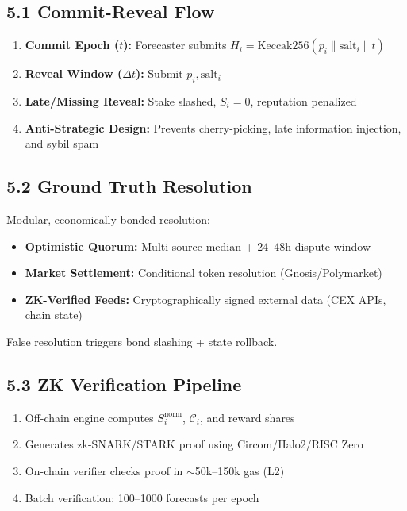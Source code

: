 \documentclass[11pt,a4paper]{article}
\begin{document}
\subsection*{5.1 Commit-Reveal Flow}
\begin{enumerate}[leftmargin=*]
    \item \textbf{Commit Epoch ($t$):} Forecaster submits $H_i = \text{Keccak256}(p_i \parallel \text{salt}_i \parallel t)$
    \item \textbf{Reveal Window ($\Delta t$):} Submit $p_i, \text{salt}_i$
    \item \textbf{Late/Missing Reveal:} Stake slashed, $S_i = 0$, reputation penalized
    \item \textbf{Anti-Strategic Design:} Prevents cherry-picking, late information injection, and sybil spam
\end{enumerate}

\subsection*{5.2 Ground Truth Resolution}
Modular, economically bonded resolution:
\begin{itemize}[leftmargin=*]
    \item \textbf{Optimistic Quorum:} Multi-source median + 24--48h dispute window
    \item \textbf{Market Settlement:} Conditional token resolution (Gnosis/Polymarket)
    \item \textbf{ZK-Verified Feeds:} Cryptographically signed external data (CEX APIs, chain state)
\end{itemize}
False resolution triggers bond slashing + state rollback.

\subsection*{5.3 ZK Verification Pipeline}
\begin{enumerate}[leftmargin=*]
    \item Off-chain engine computes $S_i^{\text{norm}}$, $\mathcal{C}_i$, and reward shares
    \item Generates zk-SNARK/STARK proof using Circom/Halo2/RISC Zero
    \item On-chain verifier checks proof in $\sim$50k--150k gas (L2)
    \item Batch verification: 100--1000 forecasts per epoch
\end{enumerate}
\end{document}
